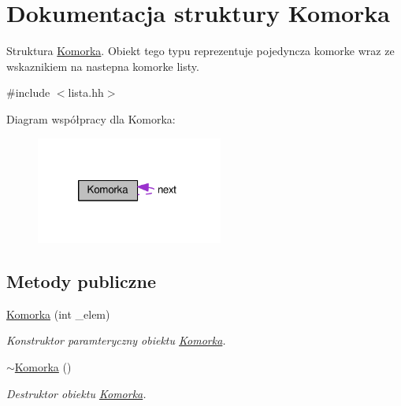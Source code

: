 \hypertarget{struct_komorka}{\section{Dokumentacja struktury Komorka}
\label{struct_komorka}
}


Struktura \hyperlink{struct_komorka}{Komorka}. Obiekt tego typu reprezentuje pojedyncza komorke wraz ze wskaznikiem na nastepna komorke listy.  




{\ttfamily \#include $<$lista.\-hh$>$}



Diagram współpracy dla Komorka\-:\nopagebreak
\begin{figure}[H]
\begin{center}
\leavevmode
\includegraphics[width=174pt]{struct_komorka__coll__graph}
\end{center}
\end{figure}
\subsection*{Metody publiczne}
\begin{DoxyCompactItemize}
\item 
\hyperlink{struct_komorka_a643e9921895597e4d2243cd10b8ee856}{Komorka} (int \-\_\-elem)
\begin{DoxyCompactList}\small\item\em Konstruktor paramteryczny obiektu \hyperlink{struct_komorka}{Komorka}. \end{DoxyCompactList}\item 
\hyperlink{struct_komorka_a6e4b1985b1400b18a0561d8ca7e4768e}{$\sim$\-Komorka} ()
\begin{DoxyCompactList}\small\item\em Destruktor obiektu \hyperlink{struct_komorka}{Komorka}. \end{DoxyCompactList}\end{DoxyCompactItemize}

